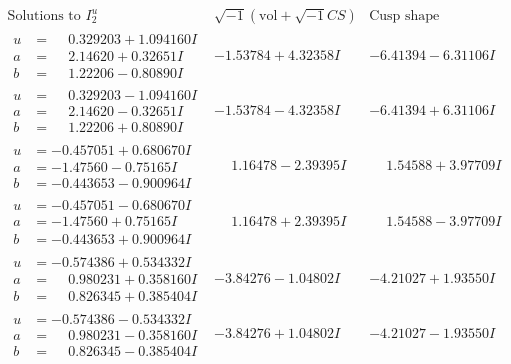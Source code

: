 \documentclass[1p]{elsarticle_modified}
\theoremstyle{definition}
\newcommand{\I}{\sqrt{-1}}
\begin{document}
$$\begin{array}{c|c|c}  
\text{Solutions to }I^u_{2}& \I (\text{vol} + \sqrt{-1}CS) & \text{Cusp shape}\\
 \hline 
\begin{aligned}
u &= \phantom{-}0.329203 + 1.094160 I \\
a &= \phantom{-}2.14620 + 0.32651 I \\
b &= \phantom{-}1.22206 - 0.80890 I\end{aligned}
 & -1.53784 + 4.32358 I & -6.41394 - 6.31106 I \\ \hline\begin{aligned}
u &= \phantom{-}0.329203 - 1.094160 I \\
a &= \phantom{-}2.14620 - 0.32651 I \\
b &= \phantom{-}1.22206 + 0.80890 I\end{aligned}
 & -1.53784 - 4.32358 I & -6.41394 + 6.31106 I \\ \hline\begin{aligned}
u &= -0.457051 + 0.680670 I \\
a &= -1.47560 - 0.75165 I \\
b &= -0.443653 - 0.900964 I\end{aligned}
 & \phantom{-}1.16478 - 2.39395 I & \phantom{-}1.54588 + 3.97709 I \\ \hline\begin{aligned}
u &= -0.457051 - 0.680670 I \\
a &= -1.47560 + 0.75165 I \\
b &= -0.443653 + 0.900964 I\end{aligned}
 & \phantom{-}1.16478 + 2.39395 I & \phantom{-}1.54588 - 3.97709 I \\ \hline\begin{aligned}
u &= -0.574386 + 0.534332 I \\
a &= \phantom{-}0.980231 + 0.358160 I \\
b &= \phantom{-}0.826345 + 0.385404 I\end{aligned}
 & -3.84276 - 1.04802 I & -4.21027 + 1.93550 I \\ \hline\begin{aligned}
u &= -0.574386 - 0.534332 I \\
a &= \phantom{-}0.980231 - 0.358160 I \\
b &= \phantom{-}0.826345 - 0.385404 I\end{aligned}
 & -3.84276 + 1.04802 I & -4.21027 - 1.93550 I \\ \hline\begin{aligned}

\end{aligned}
\end{array}$$
\end{document}
